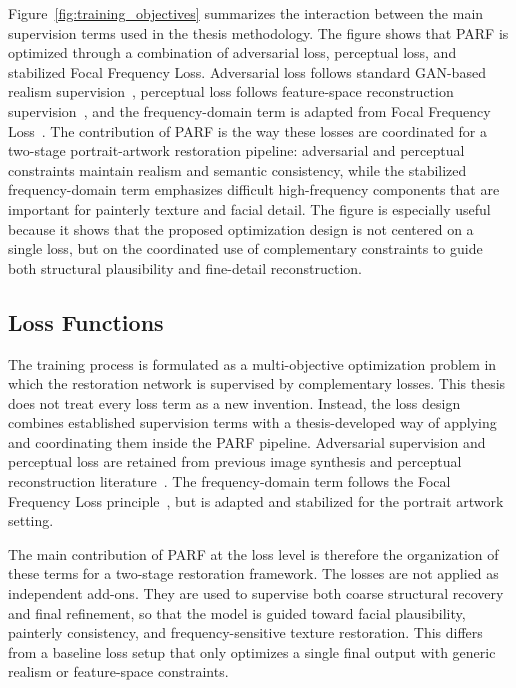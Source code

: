 \documentclass[12pt, twoside]{report}
\begin{document}
Figure~\ref{fig:training_objectives} summarizes the interaction between the main supervision terms used in the thesis methodology. The figure shows that PARF is optimized through a combination of adversarial loss, perceptual loss, and stabilized Focal Frequency Loss. Adversarial loss follows standard GAN-based realism supervision~\cite{goodfellow2014gan}, perceptual loss follows feature-space reconstruction supervision~\cite{johnson2016perceptual}, and the frequency-domain term is adapted from Focal Frequency Loss~\cite{jiang2021ffl}. The contribution of PARF is the way these losses are coordinated for a two-stage portrait-artwork restoration pipeline: adversarial and perceptual constraints maintain realism and semantic consistency, while the stabilized frequency-domain term emphasizes difficult high-frequency components that are important for painterly texture and facial detail. The figure is especially useful because it shows that the proposed optimization design is not centered on a single loss, but on the coordinated use of complementary constraints to guide both structural plausibility and fine-detail reconstruction.

\subsection{Loss Functions}

The training process is formulated as a multi-objective optimization problem in which the restoration network is supervised by complementary losses. This thesis does not treat every loss term as a new invention. Instead, the loss design combines established supervision terms with a thesis-developed way of applying and coordinating them inside the PARF pipeline. Adversarial supervision and perceptual loss are retained from previous image synthesis and perceptual reconstruction literature~\cite{goodfellow2014gan,johnson2016perceptual}. The frequency-domain term follows the Focal Frequency Loss principle~\cite{jiang2021ffl}, but is adapted and stabilized for the portrait artwork setting.

The main contribution of PARF at the loss level is therefore the organization of these terms for a two-stage restoration framework. The losses are not applied as independent add-ons. They are used to supervise both coarse structural recovery and final refinement, so that the model is guided toward facial plausibility, painterly consistency, and frequency-sensitive texture restoration. This differs from a baseline loss setup that only optimizes a single final output with generic realism or feature-space constraints.
\end{document}
